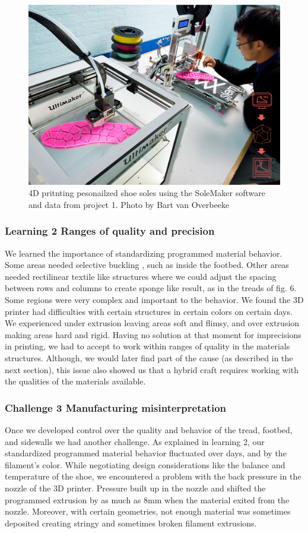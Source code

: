 \begin{figure}
\includegraphics[width=.5\textwidth]{Printing}
\caption{4D pritnting pesonailzed shoe soles using the SoleMaker software and data from project 1. Photo by Bart van Overbeeke}
\label{fig:Project2}
\end{figure}

\subsubsection{Learning 2 Ranges of quality and precision}

We learned the importance of standardizing programmed material behavior. Some areas needed selective buckling \cite{Paulose2015}, such as inside the footbed. Other areas needed rectilinear textile like structures where we could adjust the spacing between rows and columns to create sponge like result, as in the treads of fig. 6. Some regions were very complex and important to the behavior. We found the 3D printer had difficulties with certain structures in certain colors on certain days. We experienced under extrusion leaving areas soft and flimsy, and over extrusion making areas hard and rigid. Having no solution at that moment for  imprecisions in printing, we had to accept to work within ranges of quality in the materials structures. Although, we would later find part of the cause (as described in the next section), this issue also showed us that a hybrid craft requires working with the qualities of the materials available. 

\subsubsection{Challenge 3 Manufacturing misinterpretation}

Once we developed control over the quality and behavior of the tread, footbed, and sidewalls we had another challenge. As explained in learning 2, our standardized programmed material behavior fluctuated over days, and by the filament's color. While negotiating design considerations like the balance and temperature of the shoe, we encountered a problem with the back pressure in the nozzle of the 3D printer. Pressure built up in the nozzle and shifted the programmed extrusion by as much as 8mm when the material exited from the nozzle. Moreover, with certain geometries, not enough material was sometimes deposited creating stringy and sometimes broken filament extrusions. 

